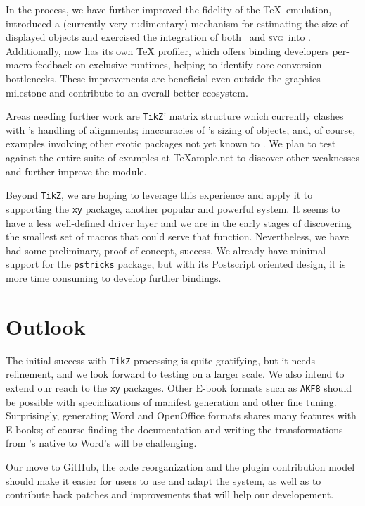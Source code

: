 \documentclass{llncs}
\def\ebook{\mbox{E-book}\xspace}
\def\svg{\textsc{svg}\xspace}
\def\tikz{\texttt{TikZ}\xspace}
\begin{document}
In the process, we have further improved the
fidelity of the \TeX\ emulation, introduced
a (currently very rudimentary) mechanism for estimating
the size of displayed objects and exercised the
integration of both \MathML\ and \svg\ into \HTML. 
Additionally, {\LaTeXML} now has its own {\TeX} profiler, which
offers binding developers per-macro feedback on
exclusive runtimes, helping to identify core conversion bottlenecks.
These improvements are beneficial even outside the graphics milestone and
contribute to an overall better {\LaTeXML} ecosystem.

Areas needing further work are \tikz' matrix
structure which currently clashes with \LaTeXML's handling
of alignments; inaccuracies of \LaTeXML's sizing of objects;
and, of course, examples involving other exotic packages
not yet known to \LaTeXML.  We plan to test against
the entire suite of examples at {\TeX}ample.net to discover
other weaknesses and further improve the module.

Beyond \tikz, we are hoping to leverage this experience and apply
it to supporting the \texttt{xy} package, another
popular and powerful system.  It seems to have a less
well-defined driver layer and we are in the early stages of
discovering the smallest set of macros that could serve that
function. Nevertheless, we have had some preliminary, proof-of-concept, success.
We already have minimal support for the \texttt{pstricks}
package, but with its Postscript oriented design,
it is more time consuming to develop further bindings.

\section{Outlook}
The initial success with \tikz processing is quite
gratifying, but it needs refinement, and we look forward to testing
on a larger scale. We also intend
to extend our reach to the \texttt{xy} packages.
Other {\ebook} formats such as \texttt{AKF8} should be possible with
specializations of manifest generation and other fine tuning.
Surprisingly, generating Word and OpenOffice formats shares many features
with {\ebook}s; of course finding the documentation and writing the {\XSLT}
transformations from \LaTeXML's native {\XML} to Word's will be challenging.

Our move to GitHub, the code reorganization and the plugin contribution model should make it easier
for users to use and adapt the system, as well as to contribute
back patches and improvements that will help our developement.

\printbibliography
\end{document}
